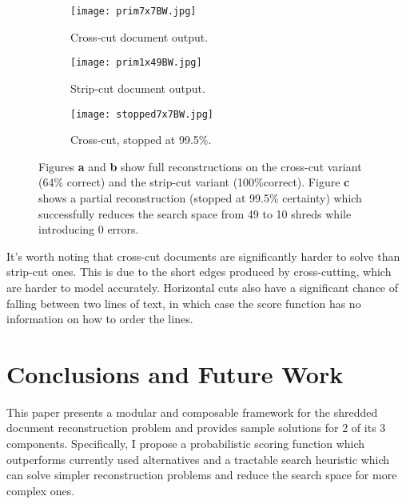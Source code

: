 \documentclass[letterpaper]{article}
\begin{document}
\begin{figure}[h]
\setlength{\abovecaptionskip}{1pt plus 1.0pt minus 2.0pt}

    \centering
    \begin{subfigure}[b]{0.48\textwidth}
        \setlength{\abovecaptionskip}{0pt plus 1.0pt minus 2.0pt}
        \centering
        \texttt{[image: prim7x7BW.jpg]}
        \caption{Cross-cut document output.}
    \end{subfigure}
    \begin{subfigure}[b]{0.23\textwidth}
        \setlength{\abovecaptionskip}{0pt plus 1.0pt minus 2.0pt}
        \centering
        \texttt{[image: prim1x49BW.jpg]}
        \caption{Strip-cut document output.}
    \end{subfigure}
    \begin{subfigure}[b]{0.23\textwidth}
        \setlength{\abovecaptionskip}{0pt plus 1.0pt minus 2.0pt}
        \centering
        \texttt{[image: stopped7x7BW.jpg]}
        \caption{Cross-cut, stopped at 99.5\%.}
    \end{subfigure}
     \caption{Figures {\bf a} and {\bf b} show full reconstructions on the cross-cut variant (64\% correct) and the strip-cut variant (100\%correct). Figure {\bf c} shows a partial reconstruction (stopped at 99.5\% certainty) which successfully reduces the search space from 49 to 10 shreds while introducing 0 errors.}
    \label{fig:searchRez}
\end{figure}
It's worth noting that cross-cut documents are significantly harder to solve than strip-cut ones. This is due to the short edges produced by cross-cutting, which are harder to model accurately. Horizontal cuts also have a significant chance of falling between two lines of text, in which case the score function has no information on how to order the lines.
\section{
\fontsize{12pt}{15pt} 
\selectfont
Conclusions and Future Work}
\fontsize{10pt}{12pt} 
\selectfont
This paper presents a modular and composable framework for the shredded document reconstruction problem and provides sample solutions for 2 of its 3 components. Specifically, I propose a probabilistic scoring function which outperforms currently used alternatives and a tractable search heuristic which can solve simpler reconstruction problems and reduce the search space for more complex ones.
\end{document}
